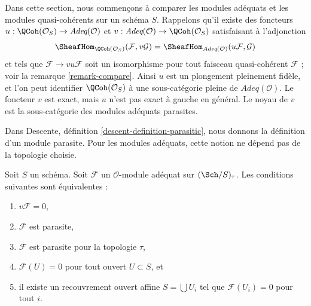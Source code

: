 \noindent
Dans cette section, nous commençons à comparer les modules adéquats et les modules
quasi-cohérents sur un schéma $S$. Rappelons qu'il existe des foncteurs
$u : \QCoh(\mathcal{O}_S) \to \textit{Adeq}(\mathcal{O})$
et
$v : \textit{Adeq}(\mathcal{O}) \to \QCoh(\mathcal{O}_S)$
satisfaisant à l'adjonction
$$
\SheafHom_{\QCoh(\mathcal{O}_S)}(\mathcal{F}, v\mathcal{G})
=
\SheafHom_{\textit{Adeq}(\mathcal{O})}(u\mathcal{F}, \mathcal{G})
$$
et tels que $\mathcal{F} \to vu\mathcal{F}$ soit un isomorphisme pour
tout faisceau quasi-cohérent $\mathcal{F}$ ; voir la
remarque \ref{remark-compare}.
Ainsi $u$ est un plongement pleinement fidèle, et l'on peut identifier
$\QCoh(\mathcal{O}_S)$ à une sous-catégorie pleine de
$\textit{Adeq}(\mathcal{O})$.
Le foncteur $v$ est exact, mais $u$ n'est pas exact à gauche en général.
Le noyau de $v$ est la sous-catégorie des modules adéquats parasites.

\medskip\noindent
Dans Descente, définition \ref{descent-definition-parasitic},
nous donnons la définition d'un module parasite.
Pour les modules adéquats, cette notion ne dépend pas
de la topologie choisie.

\begin{lemma}
\label{lemma-parasitic-adequate}
Soit $S$ un schéma.
Soit $\mathcal{F}$ un $\mathcal{O}$-module adéquat sur
$(\Sch/S)_\tau$. Les conditions suivantes sont équivalentes :
\begin{enumerate}
\item $v\mathcal{F} = 0$,
\item $\mathcal{F}$ est parasite,
\item $\mathcal{F}$ est parasite pour la topologie $\tau$,
\item $\mathcal{F}(U) = 0$ pour tout ouvert $U \subset S$, et
\item il existe un recouvrement ouvert affine $S = \bigcup U_i$
tel que $\mathcal{F}(U_i) = 0$ pour tout $i$.
\end{enumerate}
\end{lemma}


